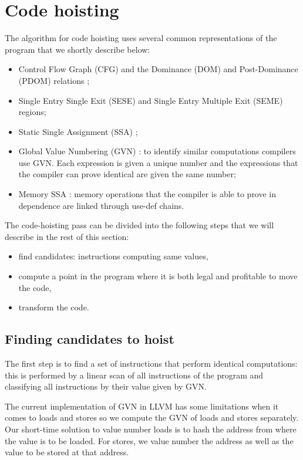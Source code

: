 \documentclass{sig-alternate}
\begin{document}
\newpage

\section{Code hoisting}

The algorithm for code hoisting uses several common representations of the
program that we shortly describe below:
\begin{itemize}
\item Control Flow Graph (CFG) and the Dominance (DOM) and Post-Dominance (PDOM)
  relations \cite{dragonbook};
\item Single Entry Single Exit (SESE) \cite{sese} and Single Entry Multiple Exit
  (SEME) regions;
\item Static Single Assignment (SSA) \cite{cytron};
\item Global Value Numbering (GVN) \cite{rosen1988global,click1995global}: to
  identify similar computations compilers use GVN.  Each expression is given a
  unique number and the expressions that the compiler can prove identical are
  given the same number;
\item Memory SSA \cite{novillo2007memory}: memory operations that the compiler
  is able to prove in dependence are linked through use-def chains.
\end{itemize}

The code-hoisting pass can be divided into the following steps that we will
describe in the rest of this section:
\begin{itemize}
\item find candidates: instructions computing same values,
\item compute a point in the program where it is both legal and profitable to
  move the code,
\item transform the code.
\end{itemize}

\subsection{Finding candidates to hoist}
The first step is to find a set of instructions that perform identical
computations: this is performed by a linear scan of all instructions of the
program and classifying all instructions by their value given by GVN.

The current implementation of GVN in LLVM has some limitations when it comes to
loads and stores so we compute the GVN of loads and stores separately.  Our
short-time solution to value number loads is to hash the address from where the
value is to be loaded. For stores, we value number the address as well as the
value to be stored at that address.
\end{document}
